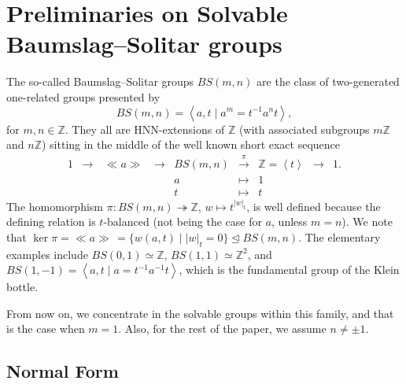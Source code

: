 \documentclass[a4paper]{amsart}
\theoremstyle{definition}
\newcommand\ZZ{\mathbb{Z}}
\newcommand{\gen}[1]{\left\langle#1\right\rangle}
\newcommand{\pres}[2]{\left\langle#1 \mid #2\right\rangle}
\newcommand{\ncl}[1]{\ll \!#1 \!\gg}
\newcommand{\B}[1]{{\color{blue} #1}}
\newcounter{mallikacomments}
\newcommand{\mallika}[1]{\textbf{\color{cyan}(R\arabic{mallikacomments})} \marginpar{\tiny\raggedright\textbf{\color{cyan}(R\arabic{mallikacomments})Mallika:} #1}
\addtocounter{mallikacomments}{1}}
\begin{document}
\section{Preliminaries on Solvable Baumslag--Solitar groups}\label{sec: BS overview}

The so-called Baumslag--Solitar groups $BS(m,n)$ are the class of two-generated one-related groups presented by 
%
\[
BS(m,n) = \pres{a,t}{a^m  = t^{-1} a^n t},
\]
%
for $m,n\in \ZZ$. They all are HNN-extensions of $\ZZ$ (with associated subgroups $m\ZZ$ and $n\ZZ$) sitting in the middle of the well known short exact sequence
 \begin{equation}\label{eq: ses}
\begin{array}{ccccccccc} 1 & \to\, & \ncl{a} & \, \to & BS(m,n) & \stackrel{\pi}{\to} & \ZZ =\gen{t} & \to & 1. \\ & & & & a & \mapsto & 1 & & \\ & & & & t & \mapsto & t & &
\end{array}
 \end{equation}
The homomorphism $\pi\colon BS(m,n)\twoheadrightarrow \ZZ$, $w\mapsto t^{|w|_t}$, is well defined because the defining relation is $t$-balanced (not being the case for $a$, unless $m=n$). We note that $\ker \pi =\ncl{a}\, =\{w(a,t) \mid |w|_t =0\}\unlhd BS(m,n)$. The elementary examples include $BS(0,1)\simeq \ZZ$, $BS(1,1)\simeq \ZZ^2$, and $BS(1,-1)=\pres{a,t}{a=t^{-1}a^{-1}t}$, which is the fundamental group of the Klein bottle.

From now on, we concentrate in the solvable groups within this family, and that is the case when $m=1$. Also, for the rest of the paper, we assume $n\neq \pm 1$. 



\subsection{Normal Form}
\end{document}
